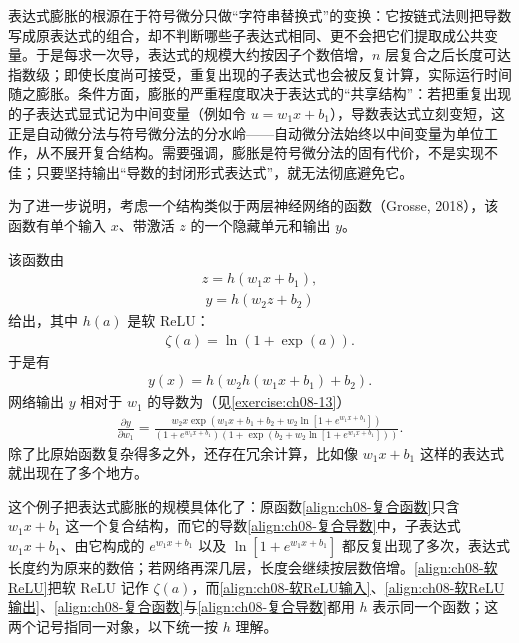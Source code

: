 \documentclass[../../main.tex]{subfiles}
\begin{document}
\begin{remark}
表达式膨胀的根源在于符号微分只做“字符串替换式”的变换：它按链式法则把导数写成原表达式的组合，却不判断哪些子表达式相同、更不会把它们提取成公共变量。于是每求一次导，表达式的规模大约按因子个数倍增，$n$ 层复合之后长度可达指数级；即使长度尚可接受，重复出现的子表达式也会被反复计算，实际运行时间随之膨胀。条件方面，膨胀的严重程度取决于表达式的“共享结构”：若把重复出现的子表达式显式记为中间变量（例如令 $u=w_1x+b_1$），导数表达式立刻变短，这正是自动微分法与符号微分法的分水岭——自动微分法始终以中间变量为单位工作，从不展开复合结构。需要强调，膨胀是符号微分法的固有代价，不是实现不佳；只要坚持输出“导数的封闭形式表达式”，就无法彻底避免它。
\end{remark}

为了进一步说明，考虑一个结构类似于两层神经网络的函数（Grosse, 2018），该函数有单个输入 $x$、带激活 $z$ 的一个隐藏单元和输出 $y$。

\begin{example}\label{example:ch08-表达式膨胀}
该函数由
\begin{align}
z=h\left(w_1x+b_1\right),
\label{align:ch08-软ReLU输入}
\end{align}
\begin{align}
y=h\left(w_2z+b_2\right)
\label{align:ch08-软ReLU输出}
\end{align}
给出，其中 $h(a)$ 是软 ReLU：
\begin{align}
\zeta(a)=\ln\left(1+\exp(a)\right).
\label{align:ch08-软ReLU}
\end{align}
于是有
\begin{align}
y(x)=h\left(w_2h\left(w_1x+b_1\right)+b_2\right).
\label{align:ch08-复合函数}
\end{align}
网络输出 $y$ 相对于 $w_1$ 的导数为（见\cref{exercise:ch08-13}）
\begin{align}
\frac{\partial y}{\partial w_1}=
\frac{w_2x\exp\left(w_1x+b_1+b_2+w_2\ln\left[1+e^{w_1x+b_1}\right]\right)}
{\left(1+e^{w_1x+b_1}\right)\left(1+\exp\left(b_2+w_2\ln\left[1+e^{w_1x+b_1}\right]\right)\right)}.
\label{align:ch08-复合导数}
\end{align}
除了比原始函数复杂得多之外，还存在冗余计算，比如像 $w_1x+b_1$ 这样的表达式就出现在了多个地方。
\end{example}

\begin{remark}
这个例子把表达式膨胀的规模具体化了：原函数\eqref{align:ch08-复合函数}只含 $w_1x+b_1$ 这一个复合结构，而它的导数\eqref{align:ch08-复合导数}中，子表达式 $w_1x+b_1$、由它构成的 $e^{w_1x+b_1}$ 以及 $\ln\left[1+e^{w_1x+b_1}\right]$ 都反复出现了多次，表达式长度约为原来的数倍；若网络再深几层，长度会继续按层数倍增。\eqref{align:ch08-软ReLU}把软 ReLU 记作 $\zeta(a)$，而\eqref{align:ch08-软ReLU输入}、\eqref{align:ch08-软ReLU输出}、\eqref{align:ch08-复合函数}与\eqref{align:ch08-复合导数}都用 $h$ 表示同一个函数；这两个记号指同一对象，以下统一按 $h$ 理解。
\end{remark}
\end{document}
